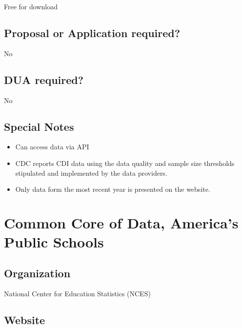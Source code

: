 \documentclass[
]{book}
\providecommand{\tightlist}{%
  \setlength{\itemsep}{0pt}\setlength{\parskip}{0pt}}
\begin{document}
Free for download

\hypertarget{proposal-or-application-required-15}{%
\section{Proposal or Application required?}\label{proposal-or-application-required-15}}

No

\hypertarget{dua-required-15}{%
\section{DUA required?}\label{dua-required-15}}

No

\hypertarget{special-notes-15}{%
\section{Special Notes}\label{special-notes-15}}

\begin{itemize}
\tightlist
\item
  Can access data via API
\item
  CDC reports CDI data using the data quality and sample size thresholds stipulated and implemented by the data providers.
\item
  Only data form the most recent year is presented on the website.
\end{itemize}

\mainmatter

\hypertarget{common-core-of-data-americas-public-schools}{%
\chapter{Common Core of Data, America's Public Schools}\label{common-core-of-data-americas-public-schools}}

\hypertarget{organization-16}{%
\section{Organization}\label{organization-16}}

National Center for Education Statistics (NCES)

\hypertarget{website-16}{%
\section{Website}\label{website-16}}
\end{document}
